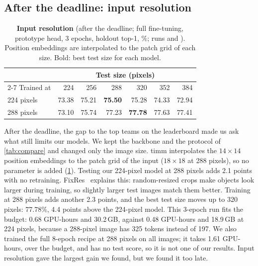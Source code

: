 \subsection{After the deadline: input resolution}
\label{sec:post}

\begin{table}[t]
  \centering
  \footnotesize
  \setlength{\tabcolsep}{3.5pt}
  \begin{tabular}{@{}lrrrrrr@{}}
    \toprule
    & \multicolumn{6}{c}{Test size (pixels)} \\
    \cmidrule(l){2-7}
    Trained at & 224 & 256 & 288 & 320 & 352 & 384 \\
    \midrule
    224 pixels & 73.38 & 75.21 & \textbf{75.50} & 75.28 & 74.33 & 72.94 \\
    288 pixels & 73.10 & 75.74 & 77.23 & \textbf{77.78} & 77.63 & 77.41 \\
    \bottomrule
  \end{tabular}
  \caption{\textbf{Input resolution} (after the deadline; full fine-tuning, prototype head, 3 epochs, holdout top-1, \%; runs  and ).
  Position embeddings are interpolated to the patch grid of each size. Bold: best test size for each model.}
  \label{tab:res}
\end{table}

After the deadline, the gap to the top teams on the leaderboard made us ask what still limits our models.
We kept the backbone and the protocol of \cref{tab:compare} and changed only the image size.
timm interpolates the $14{\times}14$ position embeddings to the patch grid of the input ($18{\times}18$ at 288 pixels), so no parameter is added (\cref{tab:res}).
Testing our 224-pixel model at 288 pixels adds 2.1 points with no retraining.
FixRes~\cite{touvron2019fixres} explains this: random-resized crops make objects look larger during training, so slightly larger test images match them better.
Training at 288 pixels adds another 2.3 points, and the best test size moves up to 320 pixels: 77.78\%, 4.4 points above the 224-pixel model.
This 3-epoch run fits the budget: 0.68 GPU-hours and 30.2\,GB, against 0.48 GPU-hours and 18.9\,GB at 224 pixels, because a 288-pixel image has 325 tokens instead of 197.
We also trained the full 8-epoch recipe at 288 pixels on all images; it takes 1.61 GPU-hours, over the budget, and has no test score, so it is not one of our results.
Input resolution gave the largest gain we found, but we found it too late.
